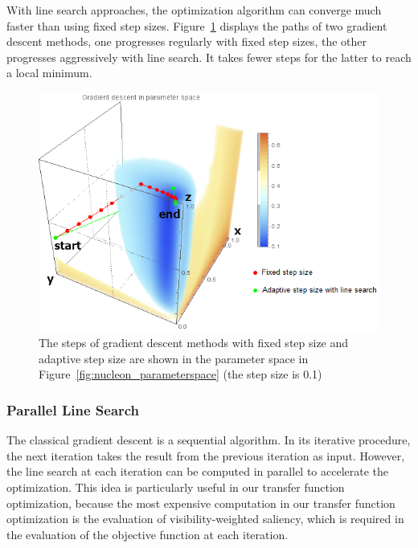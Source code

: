 With line search approaches, the optimization algorithm can converge much faster than using fixed step sizes. Figure~\ref{fig:nucleon_parameterspace_path} displays the paths of two gradient descent methods, one progresses regularly with fixed step sizes, the other progresses aggressively with line search. It takes fewer steps for the latter to reach a local minimum.

\begin{figure}
	\centering
	\begin{minipage}{.9\textwidth}
		\includegraphics[width=1\linewidth]{images/nucleon_strong_red_parameterspace_path}
	\end{minipage}
	\caption[The steps of gradient descent methods with fixed step size and adaptive step size are shown in the parameter space]{The steps of gradient descent methods with fixed step size and adaptive step size are shown in the parameter space in Figure~\ref{fig:nucleon_parameterspace} (the step size is 0.1)}
	\label{fig:nucleon_parameterspace_path}
\end{figure}

\subsubsection{Parallel Line Search}
The classical gradient descent is a sequential algorithm. In its iterative procedure, the next iteration takes the result from the previous iteration as input.
However, the line search at each iteration can be computed in parallel to accelerate the optimization. This idea is particularly useful in our transfer function optimization, because the most expensive computation in our transfer function optimization is the evaluation of visibility-weighted saliency, which is required in the evaluation of the objective function at each iteration.

